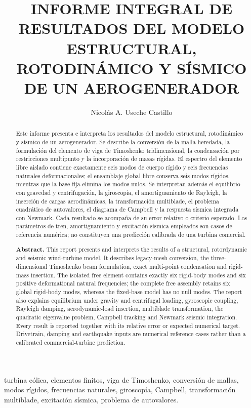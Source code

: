 \documentclass[oneside,a4paper,spanish,links]{amca}
\title{INFORME INTEGRAL DE RESULTADOS DEL MODELO ESTRUCTURAL,\\
ROTODINÁMICO Y SÍSMICO DE UN AEROGENERADOR}
\author{Nicolás A. Useche Castillo}
\affil{Departamento de Ingeniería Mecánica, Universidad de los Andes, Bogotá D.C., Colombia,\\
n.useche@uniandes.edu.co}
\begin{document}
\vspace{3cm}
\maketitle

\begin{keywords}
turbina eólica, elementos finitos, viga de Timoshenko,
conversión de mallas, modos rígidos, frecuencias naturales, giroscopía, Campbell,
transformación multiblade, excitación sísmica, problema de autovalores.
\end{keywords}

\begin{abstract}
Este informe presenta e interpreta los resultados del modelo estructural,
rotodinámico y sísmico de un aerogenerador. Se describe la conversión de la malla
heredada, la formulación del elemento de viga de Timoshenko tridimensional, la
condensación por restricciones multipunto y la incorporación de masas rígidas. El
espectro del elemento libre aislado contiene exactamente seis modos de cuerpo rígido y
seis frecuencias naturales deformacionales; el ensamblaje global libre conserva seis
modos rígidos, mientras que la base fija elimina los modos nulos. Se interpretan además
el equilibrio con gravedad y centrifugación, la giroscopía, el amortiguamiento de
Rayleigh, la inserción de cargas aerodinámicas, la transformación multiblade, el problema
cuadrático de autovalores, el diagrama de Campbell y la respuesta sísmica integrada con
Newmark. Cada resultado se acompaña de su error relativo o criterio esperado. Los
parámetros de tren, amortiguamiento y excitación sísmica empleados son casos de
referencia numérica; no constituyen una predicción calibrada de una turbina comercial.

\vspace{6pt}
\noindent\textbf{Abstract.} This report presents and interprets the results of a
structural, rotordynamic and seismic wind-turbine model. It describes legacy-mesh
conversion, the three-dimensional Timoshenko beam formulation, exact multi-point
condensation and rigid-mass insertion. The isolated free element contains exactly six
rigid-body modes and six positive deformational natural frequencies; the complete free
assembly retains six global rigid-body modes, whereas the fixed-base model has no null
modes. The report also explains equilibrium under gravity and centrifugal loading,
gyroscopic coupling, Rayleigh damping, aerodynamic-load insertion, multiblade
transformation, the quadratic eigenvalue problem, Campbell tracking and Newmark seismic
integration. Every result is reported together with its relative error or expected
numerical target. Drivetrain, damping and earthquake inputs are numerical reference
cases rather than a calibrated commercial-turbine prediction.
\end{abstract}
\end{document}
